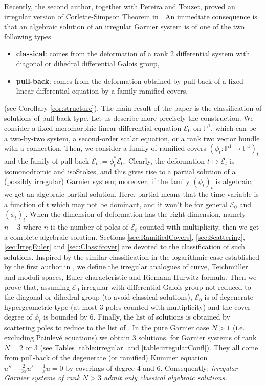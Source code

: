 \documentclass[12]{amsart}
\begin{document}
Recently, the second author, together with Pereira and Touzet, proved an irregular version of Corlette-Simpson
Theorem in \cite{LPT}. An immediate consequence is that an algebraic solution of an irregular Garnier
system is of one of the two following types
\begin{itemize}
\item {\bf classical}: comes from the deformation of a rank $2$ differential system with diagonal 
or dihedral differential Galois group,
\item {\bf pull-back}: comes from the deformation obtained by pull-back of a fixed linear differential equation
by a family ramified covers.
\end{itemize}
(see Corollary \ref{cor:structure}).
The main result of the paper is the classification of solutions of pull-back type. Let us describe more precisely the construction.
We consider a fixed meromorphic linear differential
equation $\mathcal E_0$ on $\mathbb P^1$, which can be a two-by-two system, a second-order scalar equation, or a rank two
vector bundle with a connection. Then, we consider a family of ramified covers $(\phi_t:\mathbb P^1\to \mathbb P^1)_t$
and the family of pull-back $\mathcal E_t:=\phi_t^*\mathcal E_0$. Clearly, the deformation $t\mapsto \mathcal E_t$
is isomonodromic and isoStokes, and this gives rise to a partial solution of a (possibly irregular) Garnier system;
moreover, if the family $(\phi_t)_t$ is algebraic, we get an algebraic partial solution.
Here, partial means that the time variable is a function of $t$ which may not be dominant,
and it won't be for general $\mathcal E_0$ and $(\phi_t)_t$. When the dimension of deformation 
has the right dimension, namely $n-3$ where $n$ is the number of poles of $\mathcal E_t$
counted with multiplicity, then we get a complete algebraic solution. Sections \ref{sec:RamifiedCovers},
\ref{sec:Scattering}, \ref{sec:IrregEuler} and \ref{sec:Classifcover} are devoted to the classification 
of such solutions. Inspired by the similar classification in the logarithmic case established by the first author in \cite{Diarra1},
we define the irregular analogues of curve, Teichm\"uller and moduli spaces, Euler characteristic and Riemann-Hurwitz
formula. Then we prove that, assuming $\mathcal E_0$ irregular with differential Galois group not reduced to 
the diagonal or dihedral group (to avoid classical solutions), $\mathcal E_0$ is of degenerate hypergeometric type 
(at most $3$ poles counted with multiplicity) and the cover degree of $\phi_t$ is bounded by $6$.
Finally, the list of solutions is obtained by scattering poles to reduce to the list of \cite{Diarra1}.
In the pure Garnier case $N>1$ (i.e. excluding Painlev\'e equations) we obtain $3$ solutions, 
for Garnier systems of rank $N=2$ or $3$ (see Tables \ref{table:irregular} and \ref{table:irregularConfl}). 
They all come from pull-back of the degenerate (or ramified) Kummer equation $u''+\frac{2}{3x}u'-\frac{1}{x}u=0$
by coverings of degree $4$ and $6$.
Consequently:
{\it irregular Garnier systems of rank $N>3$ admit only classical algebraic solutions.}
\end{document}
